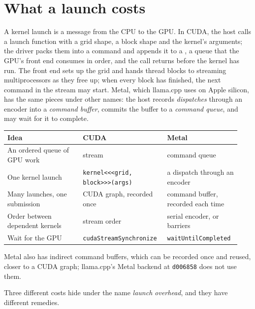 \section{What a launch costs}

A kernel launch is a message from the CPU to the GPU. In CUDA, the host calls
a launch function with a grid shape, a block shape and the kernel's arguments;
the driver packs them into a command and appends it to a , a queue
that the GPU's front end consumes in order, and the call returns before the
kernel has run. The front end sets up the grid and hands thread blocks to
streaming multiprocessors as they free up; when every block has finished, the
next command in the stream may start. Metal, which llama.cpp uses on Apple
silicon, has the same pieces under other names: the host records
\emph{dispatches} through an encoder into a \emph{command buffer}, commits the
buffer to a \emph{command queue}, and may wait for it to complete.

\begin{center}\small
\begin{tabular}{@{}>{\raggedright\arraybackslash}p{0.31\linewidth}>{\raggedright\arraybackslash}p{0.33\linewidth}>{\raggedright\arraybackslash}p{0.3\linewidth}@{}}
\toprule
Idea & CUDA & Metal \\
\midrule
An ordered queue of GPU work & stream & command queue \\
One kernel launch & \verb|kernel<<<grid, block>>>(args)| & a dispatch through an encoder \\
Many launches, one submission & CUDA graph, recorded once & command buffer, recorded each time \\
Order between dependent kernels & stream order & serial encoder, or barriers \\
Wait for the GPU & \texttt{cudaStreamSynchronize} & \texttt{waitUntilCompleted} \\
\bottomrule
\end{tabular}
\end{center}

\noindent Metal also has indirect command buffers, which can be recorded once
and reused, closer to a CUDA graph; llama.cpp's Metal backend at
\texttt{d006858} does not use them.

Three different costs hide under the name \emph{launch overhead}, and they
have different remedies.

